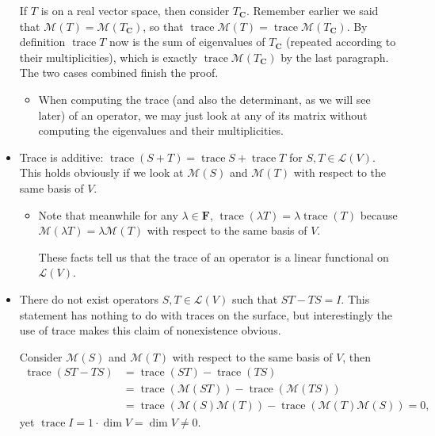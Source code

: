 \documentclass[11pt]{article}
\newcommand{\C}{\mathbf{C}}
\newcommand{\F}{\mathbf{F}}
\renewcommand{\d}{\dim}
\newcommand{\tr}{\operatorname{trace}}
\newcommand{\LV}{\mathcal{L}(V)}
\newcommand{\M}{\mathcal{M}}
\begin{document}
\begin{itemize}
    If $T$ is on a real vector space, then consider $T_\C$. Remember earlier we said that $\M(T) = \M(T_\C)$, so that $\tr \M(T) = \tr \M(T_\C)$. By definition $\tr T$ now is the sum of eigenvalues of $T_\C$ (repeated according to their multiplicities), which is exactly $\tr \M(T_\C)$ by the last paragraph. The two cases combined finish the proof.
    \begin{itemize}
        \item When computing the trace (and also the determinant, as we will see later) of an operator, we may just look at any of its matrix without computing the eigenvalues and their multiplicities.
    \end{itemize}
    \item Trace is additive: $\tr(S+T) = \tr S + \tr T$ for $S,T \in \LV$. This holds obviously if we look at $\M(S)$ and $\M(T)$ with respect to the same basis of $V$.
    \begin{itemize}
        \item Note that meanwhile for any $\lambda \in \F$, $\tr(\lambda T) = \lambda \tr(T)$ because $\M(\lambda T) = \lambda \M(T)$ with respect to the same basis of $V$.
        
        These facts tell us that the trace of an operator is a linear functional on $\LV$.
    \end{itemize}
    \item There do not exist operators $S,T \in \LV$ such that $ST - TS = I$. This statement has nothing to do with traces on the surface, but interestingly the use of trace makes this claim of nonexistence obvious.
    
    Consider $\M(S)$ and $\M(T)$ with respect to the same basis of $V$, then
    \begin{align*}
        \tr(ST - TS) & = \tr(ST) - \tr(TS) \\ & = \tr(\M(ST)) - \tr(\M(TS)) \\ & = \tr(\M(S)\M(T)) - \tr(\M(T)\M(S)) = 0,
    \end{align*}
    yet $\tr I = 1 \cdot \d V = \d V \neq 0$.
\end{itemize}
\end{document}
